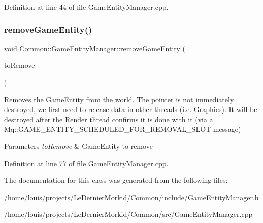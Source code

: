 Definition at line 44 of file Game\+Entity\+Manager.\+cpp.

\mbox{\label{class_common_1_1_game_entity_manager_ab08fbd68fbafbf170abe71f7815b7a13}} 
\subsubsection{\texorpdfstring{remove\+Game\+Entity()}{removeGameEntity()}}
{\footnotesize\ttfamily void Common\+::\+Game\+Entity\+Manager\+::remove\+Game\+Entity (\begin{DoxyParamCaption}\item[{\hyperlink{struct_common_1_1_game_entity}{Game\+Entity} $\ast$}]{to\+Remove }\end{DoxyParamCaption})}

Removes the \hyperlink{struct_common_1_1_game_entity}{Game\+Entity} from the world. The pointer is not immediately destroyed, we first need to release data in other threads (i.\+e. Graphics). It will be destroyed after the Render thread confirms it is done with it (via a Mq\+::\+G\+A\+M\+E\+\_\+\+E\+N\+T\+I\+T\+Y\+\_\+\+S\+C\+H\+E\+D\+U\+L\+E\+D\+\_\+\+F\+O\+R\+\_\+\+R\+E\+M\+O\+V\+A\+L\+\_\+\+S\+L\+OT message) 
\begin{DoxyParams}{Parameters}
{\em to\+Remove} & \hyperlink{struct_common_1_1_game_entity}{Game\+Entity} to remove \\
\hline
\end{DoxyParams}


Definition at line 77 of file Game\+Entity\+Manager.\+cpp.



The documentation for this class was generated from the following files\+:\begin{DoxyCompactItemize}
\item 
/home/louis/projects/\+Le\+Dernier\+Morkid/\+Common/include/Game\+Entity\+Manager.\+h\item 
/home/louis/projects/\+Le\+Dernier\+Morkid/\+Common/src/Game\+Entity\+Manager.\+cpp\end{DoxyCompactItemize}
